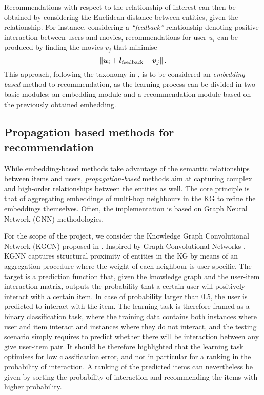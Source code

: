 Recommendations  with respect to the relationship of interest can then be obtained by considering the Euclidean distance between entities, given the relationship.
For instance, considering a \emph{``feedback''} relationship denoting positive interaction between users and movies, recommendations for user $u_i$ can be produced by finding the movies $v_j$ that minimise 
\begin{equation}\label{eq:transe_interaction}
  \left\lVert\boldsymbol{u}_i + \boldsymbol{l}_{\text{feedback}} - \boldsymbol{v}_j\right\rVert.
\end{equation}
This approach, following the taxonomy in \cite{guo2020survey}, is to be considered an \emph{embedding-based} method to recommendation, as the learning process can be divided in two basic modules: an embedding module and a recommendation module based on the previously obtained embedding.


\subsection{Propagation based methods for recommendation}\label{sec:kgcn}

While embedding-based methods take advantage of the semantic relationships between items and users, \emph{propagation-based} methods aim at capturing complex and high-order relationships between the entities as well.
The core principle is that of aggregating embeddings of multi-hop neighbours in the KG to refine the embeddings themselves.
Often, the implementation is based on Graph Neural Network (GNN) methodologies.

For the scope of the project, we consider the Knowledge Graph Convolutional Network (KGCN) proposed in \cite{wang2019knowledge}.
Inspired by Graph Convolutional Networks \parencite{zhang2019graph}, KGNN captures structural proximity of entities in the KG by means of an aggregation procedure where the weight of each neighbour is user specific.
The target is a prediction function that, given the knowledge graph and the user-item interaction matrix, outputs the probability that a certain user will positively interact with a certain item.
In case of probability larger than $0.5$, the user is predicted to interact with the item.
The learning task is therefore framed as a binary classification task, where the training data contains both instances where user and item interact and instances where they do not interact, and the testing scenario simply requires to predict whether there will be interaction between any give user-item pair.
It should be therefore highlighted that the learning task optimises for low classification error, and not in particular for a ranking in the probability of interaction.
A ranking of the predicted items can nevertheless be given by sorting the probability of interaction and recommending the items with higher probability.


